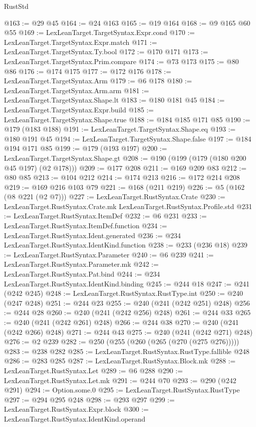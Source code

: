 \begin{lexlean}{RustStd}
\begin{coremodule}
@163 := @29 @45
@164 := @24 @163
@165 := @19 @164
@168 := @9 @165 @60 @55
@169 := LexLeanTarget.TargetSyntax.Expr.cond
@170 := LexLeanTarget.TargetSyntax.Expr.match
@171 := LexLeanTarget.TargetSyntax.Ty.bool
@172 := @170 @171
@173 := LexLeanTarget.TargetSyntax.Prim.compare
@174 := @73 @173
@175 := @80 @86
@176 := @174 @175
@177 := @172 @176
@178 := LexLeanTarget.TargetSyntax.Arm
@179 := @6 @178
@180 := LexLeanTarget.TargetSyntax.Arm.arm
@181 := LexLeanTarget.TargetSyntax.Shape.lt
@183 := @180 @181 @45
@184 := LexLeanTarget.TargetSyntax.Expr.build
@185 := LexLeanTarget.TargetSyntax.Shape.true
@188 := @184 @185 @171 @85
@190 := @179 (@183 @188)
@191 := LexLeanTarget.TargetSyntax.Shape.eq
@193 := @180 @191 @45
@194 := LexLeanTarget.TargetSyntax.Shape.false
@197 := @184 @194 @171 @85
@199 := @179 (@193 @197)
@200 := LexLeanTarget.TargetSyntax.Shape.gt
@208 := @190 (@199 (@179 (@180 @200 @45 @197) (@2 @178)))
@209 := @177 @208
@211 := @169 @209 @83
@212 := @80 @85
@213 := @104 @212
@214 := @174 @213
@216 := @172 @214 @208
@219 := @169 @216 @103 @79
@221 := @168 (@211 @219)
@226 := @5 (@162 (@8 @221 (@2 @7)))
@227 := LexLeanTarget.RustSyntax.Crate
@230 := LexLeanTarget.RustSyntax.Crate.mk LexLeanTarget.RustSyntax.Profile.std
@231 := LexLeanTarget.RustSyntax.ItemDef
@232 := @6 @231
@233 := LexLeanTarget.RustSyntax.ItemDef.function
@234 := LexLeanTarget.RustSyntax.Ident.generated
@236 := @234 LexLeanTarget.RustSyntax.IdentKind.function
@238 := @233 (@236 @18)
@239 := LexLeanTarget.RustSyntax.Parameter
@240 := @6 @239
@241 := LexLeanTarget.RustSyntax.Parameter.mk
@242 := LexLeanTarget.RustSyntax.Pat.bind
@244 := @234 LexLeanTarget.RustSyntax.IdentKind.binding
@245 := @244 @18
@247 := @241 (@242 @245)
@248 := LexLeanTarget.RustSyntax.RustType.int
@250 := @240 (@247 @248)
@251 := @244 @23
@255 := @240 (@241 (@242 @251) @248)
@256 := @244 @28
@260 := @240 (@241 (@242 @256) @248)
@261 := @244 @33
@265 := @240 (@241 (@242 @261) @248)
@266 := @244 @38
@270 := @240 (@241 (@242 @266) @248)
@271 := @244 @43
@275 := @240 (@241 (@242 @271) @248)
@276 := @2 @239
@282 := @250 (@255 (@260 (@265 (@270 (@275 @276)))))
@283 := @238 @282
@285 := LexLeanTarget.RustSyntax.RustType.fallible @248
@286 := @283 @285
@287 := LexLeanTarget.RustSyntax.Block.mk
@288 := LexLeanTarget.RustSyntax.Let
@289 := @6 @288
@290 := LexLeanTarget.RustSyntax.Let.mk
@291 := @244 @70
@293 := @290 (@242 @291)
@294 := Option.some.{0}
@295 := LexLeanTarget.RustSyntax.RustType
@297 := @294 @295 @248
@298 := @293 @297
@299 := LexLeanTarget.RustSyntax.Expr.block
@300 := LexLeanTarget.RustSyntax.IdentKind.operand

\end{coremodule}
\end{lexlean}
